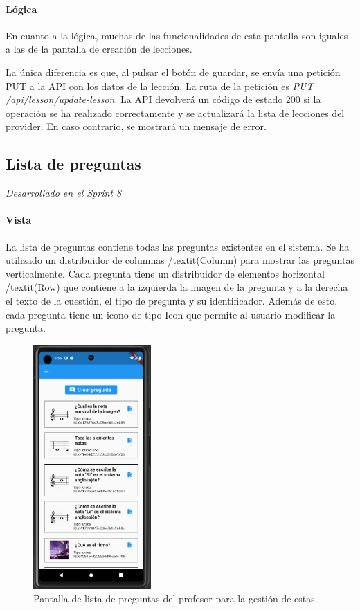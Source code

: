 \paragraph*{Lógica}
En cuanto a la lógica, muchas de las funcionalidades de esta pantalla son iguales a las de la pantalla de creación de lecciones.

La única diferencia es que, al pulsar el botón de guardar, se envía una petición PUT a la API con los datos de la lección. La ruta de la petición es \textit{PUT /api/lesson/update-lesson}. La API devolverá un código de estado 200 si la operación se ha realizado correctamente y se actualizará la lista de lecciones del provider. En caso contrario, se mostrará un mensaje de error.

\newpage
\subsection{Lista de preguntas} 

\textit{Desarrollado en el Sprint 8}

\paragraph*{Vista}
La lista de preguntas contiene todas las preguntas existentes en el sistema. Se ha utilizado un distribuidor de columnas /textit{(Column)} para mostrar las preguntas verticalmente. 
Cada pregunta tiene un distribuidor de elementos horizontal /textit{(Row)} que contiene a la izquierda la imagen de la pregunta y a la derecha el texto de la cuestión, el tipo de pregunta y su identificador. 
Además de esto, cada pregunta tiene un icono de tipo Icon que permite al usuario modificar la pregunta.
\begin{figure}[H]
  \centering
  \includegraphics[width=0.4\textwidth]{imagenes/c7/listapreguntas.png}
  \caption{Pantalla de lista de preguntas del profesor para la gestión de estas.} 
  \label{fig:listapreguntas}
\end{figure}

